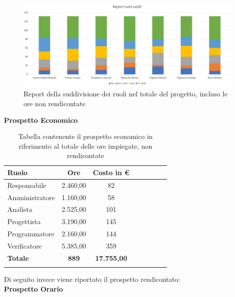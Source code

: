 \documentclass[../piano_di_progetto.tex]{subfiles}
\begin{document}
\begin{figure}[H]
\centering
\includegraphics[width=12cm]{componenti/img/report_ruoli_tot}
\caption{Report della suddivisione dei ruoli nel totale del progetto, incluso le ore non rendicontate}
\end{figure}

\textbf{Prospetto Economico}

\begin{center}
	\begin{longtable}{|l|c|c|c|c|c|c|c|}
		\hline
		\rowcolor{lightgray}
		\textbf{Ruolo} & \textbf{Ore} & \textbf{Costo in €}\\

		\hline
		Responsabile & 2.460,00 & 82 \\
		\hline
		Amministratore & 1.160,00 & 58 \\
		\hline
		Analista & 2.525,00 & 101 \\
		\hline
		Progettista & 3.190,00 & 145 \\
		\hline
		Programmatore & 2.160,00 & 144 \\
		\hline
		Verificatore & 5.385,00 & 359 \\
		\hline
		\textbf{Totale} & \textbf{889} & \textbf{17.755,00}\\
		\hline

		\caption{Tabella contenente il prospetto economico in riferimento al totale delle ore impiegate, non rendicontate}
	\end{longtable}
\end{center}


Di seguito invece viene riportato il prospetto rendicontato:\\

\textbf{Prospetto Orario}
\end{document}
